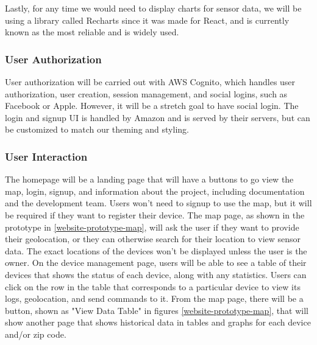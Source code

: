 Lastly, for any time we would need to display charts for sensor data, we will be using a library
called Recharts since it was made for React, and is currently known as the most reliable and is
widely used.


\subsubsection{User Authorization}
User authorization will be carried out with AWS Cognito, which handles user authorization, user
creation, session management, and social logins, such as Facebook or Apple. However, it will be
a stretch goal to have social login. The login and signup UI is handled by Amazon and is served by
their servers, but can be customized to match our theming and styling.

\subsubsection{User Interaction}
The homepage will be a landing page that will have a buttons to go view the map, login, signup, and
information about the project, including documentation and the development team. Users won't need to
signup to use the map, but it will be required if they want to register their device. The map page,
as shown in the prototype in \ref{website-prototype-map}, will ask the user if they want to provide
their geolocation, or they can otherwise search for their location to view sensor data. The exact
locations of the devices won't be displayed unless the user is the owner. On the device management
page, users will be able to see a table of their devices that shows the status of each device, along
with any statistics. Users can click on the row in the table that corresponds to a particular
device to view its logs, geolocation, and send commands to it. From the map page, there will be
a button, shown as "View Data Table" in figures \ref{website-prototype-map}, that will show another
page that shows historical data in tables and graphs for each device and/or zip code.
